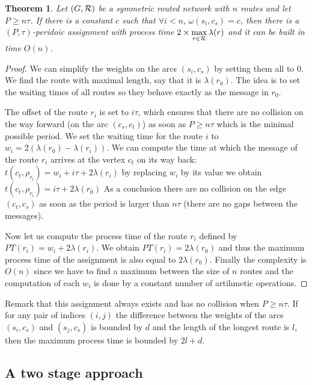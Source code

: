 \documentclass[a4paper,10pt]{article}
\newtheorem{theorem}{Theorem}
\begin{document}
	 \begin{theorem}
	 Let $(G,{\cal R})$ be a symmetric routed network with $n$ routes and let $P \geq n\tau$. If there is a constant $c$ such that $\forall i < n, \,\omega(s_i,c_s) = c$, then there is a $(P,\tau)$-peridoic assignment with process time $2 \times \displaystyle{\max_{r\in {\cal R}} \lambda(r)}$ and it can be built in time $O(n)$.
	 \end{theorem}
      \begin{proof}
      
        We can simplify the weights on the arcs $(s_i,c_s)$ by setting them all to $0$.
        We find the route with maximal length, say that it is $\lambda(r_0)$. The idea is to 
        set the waiting times of all routes so they behave exactly as the message in $r_0$.
        
        The offset of the route $r_i$ is set to $i\tau$, which ensures that there are no collision on the way forward (on the arc $(c_s,c_t)$) as soon as $P \geq n\tau$ which is the minimal possible period. We set the waiting time for the route $i$ to $w_i = 2(\lambda(r_{0}) - \lambda(r_{i}))$. We can compute the time at which the message of the route $r_i$ arrives at the vertex $c_t$ on its way back: $t(c_t,\rho_{r_i}) = w_i + i\tau + 2\lambda(r_{i})$
        by replacing $w_i$ by its value we obtain $t(c_t,\rho_{r_i}) =  i\tau + 2\lambda(r_{0})$
        As a conclusion there are no collision on the edge $(c_t,c_s)$ as soon as the 
        period is larger than $n\tau$ (there are no gaps between the messages).
        
        Now let us compute the process time of the route $r_i$ defined by $PT(r_i) = w_i + 2\lambda(r_{i}) $. We obtain $PT(r_i) = 2\lambda(r_{0})$ and thus the maximum process time of the assignment is also equal to $2\lambda(r_0)$.
	Finally the complexity is $O(n)$ since we have to find a maximum between the size of $n$ routes and the computation of each $w_i$ is done by a constant number of artihmetic operations.
     \end{proof}
     
     Remark that this assignment always exists and has no collision when $P \geq n\tau$. 
     If for any pair of indices $(i,j)$ the difference between the weights of the arcs $(s_i,c_s)$ and $(s_j,c_s)$ is bounded 
     by $d$ and the length of the longest route is $l$, then the maximum process time is bounded by  $2l + d$.

     
     \subsection{A two stage approach}
     
\end{document}
